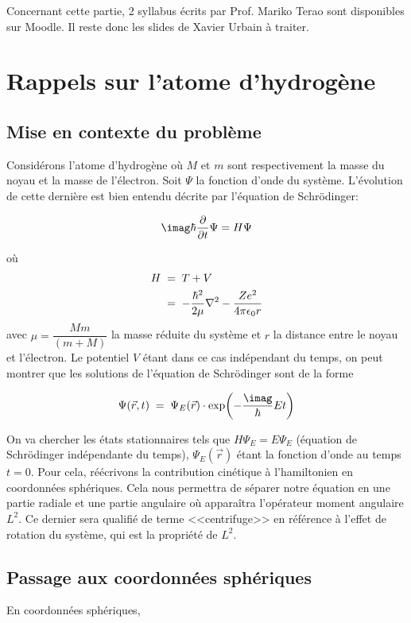 ﻿Concernant cette partie, 2 syllabus écrits par Prof. Mariko Terao sont disponibles sur Moodle. Il reste donc les slides de Xavier Urbain à traiter.

\section{Rappels sur l'atome d'hydrogène}

\subsection{Mise en contexte du problème}

Considérons l'atome d'hydrogène où $M$ et $m$ sont respectivement la masse du noyau et la masse de l'électron. Soit $\Psi$ la fonction d'onde du système. L'évolution de cette dernière est bien entendu décrite par l'équation de Schrödinger:

\[\imag\hbar \dfrac{\partial}{\partial t}\Psi=H\Psi\]

où \begin{align}
H&\; = \; T+V \\
&\; = \; -\dfrac{\hbar^2}{2\mu}\nabla^2-\dfrac{Ze^2}{4\pi \epsilon_0 r}
\end{align}
avec $\mu=\dfrac{Mm}{(m+M)}$ la masse réduite du système et $r$ la distance entre le noyau et l'électron. Le potentiel $V$ étant dans ce cas indépendant du temps, on peut montrer que les solutions de l'équation de Schrödinger sont de la forme

\[
    \Psi(\Vec{r},t) \eq \Psi_E(\Vec{r}) \cdot \exp(-\dfrac{\imag}{\hbar}Et)
\]


On va chercher les états stationnaires tels que $H\Psi_E=E\Psi_E$ (équation de Schrödinger indépendante du temps), $\Psi_E(\Vec{r})$ étant la fonction d'onde au temps $t=0$. Pour cela, réécrivons la contribution cinétique à l'hamiltonien en coordonnées sphériques. Cela nous permettra de séparer notre équation en une partie radiale et une partie angulaire où apparaîtra l'opérateur moment angulaire $L^2$. Ce dernier sera qualifié de terme <<centrifuge>> en référence à l'effet de rotation du système, qui est la propriété de $L^2$.

\subsection{Passage aux coordonnées sphériques}

En coordonnées sphériques,

